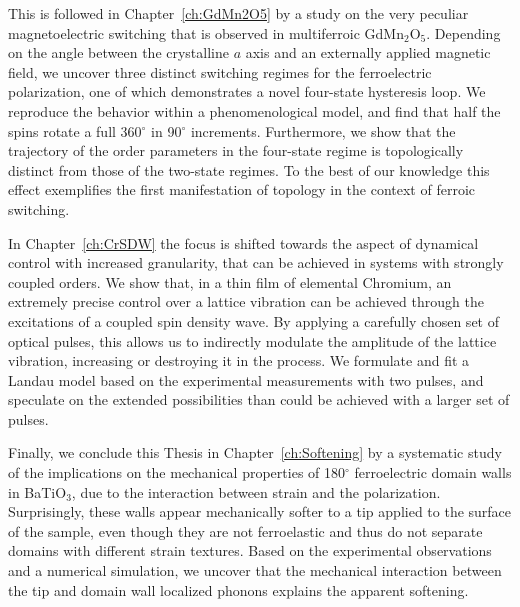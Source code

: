 \documentclass[phd, titlesmallcaps,copyrightpage,foronline,oneside]{SNSthesis}
\def\Include#1{%
        \def\ChapterPath{#1/}%
        \def\GraphicsPath{\ChapterPath Images/}%
        }
\begin{document}
This is followed in Chapter~\ref{ch:GdMn2O5} by a study on the very peculiar magnetoelectric switching that is observed in multiferroic GdMn$_2$O$_5$.
Depending on the angle between the crystalline $a$ axis and an externally applied magnetic field, we uncover three distinct switching regimes for the ferroelectric polarization, one of which demonstrates a novel four-state hysteresis loop.
We reproduce the behavior within a phenomenological model, and find that half the spins rotate a full 360$^\circ$ in 90$^\circ$ increments.
Furthermore, we show that the trajectory of the order parameters in the four-state regime is topologically distinct from those of the two-state regimes. To the best of our knowledge this effect exemplifies the first manifestation of topology in the context of ferroic switching.

In Chapter~\ref{ch:CrSDW} the focus is shifted towards the aspect of dynamical control with increased granularity, that can be achieved in systems with strongly coupled orders.
We show that, in a thin film of elemental Chromium, an extremely precise control over a lattice vibration can be achieved through the excitations of a coupled spin density wave.
By applying a carefully chosen set of optical pulses, this allows us to indirectly modulate the amplitude of the lattice vibration, increasing or destroying it in the process.
We formulate and fit a Landau model based on the experimental measurements with two pulses, and speculate on the extended possibilities than could be achieved with a larger set of pulses. 

Finally, we conclude this Thesis in Chapter~\ref{ch:Softening} by a systematic study of the implications on the mechanical properties of 180$^\circ$ ferroelectric domain walls in BaTiO$_3$, due to the interaction between strain and the polarization.
Surprisingly, these walls appear mechanically softer to a tip applied to the surface of the sample, even though they are not ferroelastic and thus do not separate domains with different strain textures.
Based on the experimental observations and a numerical simulation, we uncover that the mechanical interaction between the tip and domain wall localized phonons explains the apparent softening.


% 
\end{document}

